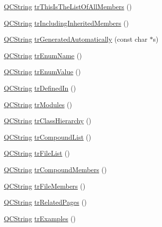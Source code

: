 \begin{DoxyCompactItemize}
\hyperlink{class_q_c_string}{Q\-C\-String} \hyperlink{class_translator_portuguese_aa4890a86c6f0232638bedf799b9cd600}{tr\-This\-Is\-The\-List\-Of\-All\-Members} ()
\item 
\hyperlink{class_q_c_string}{Q\-C\-String} \hyperlink{class_translator_portuguese_aac1033d8aaef30fde3dc36b7c207820d}{tr\-Including\-Inherited\-Members} ()
\item 
\hyperlink{class_q_c_string}{Q\-C\-String} \hyperlink{class_translator_portuguese_ae1830086931960c6fed36f1e7ea2e276}{tr\-Generated\-Automatically} (const char $\ast$s)
\item 
\hyperlink{class_q_c_string}{Q\-C\-String} \hyperlink{class_translator_portuguese_a7a6e29ca486072455bf3083ba8acfc18}{tr\-Enum\-Name} ()
\item 
\hyperlink{class_q_c_string}{Q\-C\-String} \hyperlink{class_translator_portuguese_a8504c48d2e7c98cdc58adb8c413bb583}{tr\-Enum\-Value} ()
\item 
\hyperlink{class_q_c_string}{Q\-C\-String} \hyperlink{class_translator_portuguese_a5808bd55db4b980bf98c20386a6f7766}{tr\-Defined\-In} ()
\item 
\hyperlink{class_q_c_string}{Q\-C\-String} \hyperlink{class_translator_portuguese_a7e7c4c8a0ebc34babcc72f2bf0b6a7e4}{tr\-Modules} ()
\item 
\hyperlink{class_q_c_string}{Q\-C\-String} \hyperlink{class_translator_portuguese_a2d2a657e41d15d96eef584d0b16ac838}{tr\-Class\-Hierarchy} ()
\item 
\hyperlink{class_q_c_string}{Q\-C\-String} \hyperlink{class_translator_portuguese_a89f7ed81df77d5e01296302aa818dced}{tr\-Compound\-List} ()
\item 
\hyperlink{class_q_c_string}{Q\-C\-String} \hyperlink{class_translator_portuguese_ad08ad4ba93076dfedb11dc43ca915a24}{tr\-File\-List} ()
\item 
\hyperlink{class_q_c_string}{Q\-C\-String} \hyperlink{class_translator_portuguese_acca37a92198919ac1908fd388ed78659}{tr\-Compound\-Members} ()
\item 
\hyperlink{class_q_c_string}{Q\-C\-String} \hyperlink{class_translator_portuguese_a2dc4f441708f3450ac98024452bac1d0}{tr\-File\-Members} ()
\item 
\hyperlink{class_q_c_string}{Q\-C\-String} \hyperlink{class_translator_portuguese_ac3e324016cdf6853802ffdf387a229a8}{tr\-Related\-Pages} ()
\item 
\hyperlink{class_q_c_string}{Q\-C\-String} \hyperlink{class_translator_portuguese_a49399a22bda9ddf0ad639669581002d4}{tr\-Examples} ()

\end{DoxyCompactItemize}
